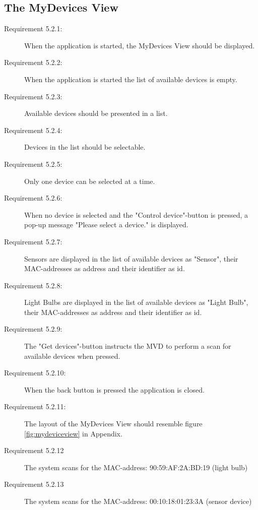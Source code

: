\documentclass[a4paper]{article}
\begin{document}
\subsection{The MyDevices View}
\begin{description}
\item[Requirement 5.2.1:] When the application is started, the MyDevices View should be displayed.

\item[Requirement 5.2.2:] When the application is started the list of available devices is empty.

\item[Requirement 5.2.3:] Available devices should be presented in a list.

\item[Requirement 5.2.4:] Devices in the list should be selectable.

\item[Requirement 5.2.5:] Only one device can be selected at a time.

\item[Requirement 5.2.6:] When no device is selected and the "Control device"-button is pressed, a pop-up message "Please select a device." is displayed.

\item[Requirement 5.2.7:] Sensors are displayed in the list of available devices as "Sensor", their MAC-addresses as address and their identifier as id.

\item[Requirement 5.2.8:] Light Bulbs are displayed in the list of available devices as "Light Bulb", their MAC-addresses as address and their identifier as id.

\item[Requirement 5.2.9:] The "Get devices"-button instructs the MVD to perform a scan for available devices when pressed.

\item[Requirement 5.2.10:] When the back button is pressed the application is closed.

\item[Requirement 5.2.11:] The layout of the MyDevices View should resemble figure \ref{fig:mydeviceview} in Appendix.

\item[Requirement 5.2.12] The system scans for the MAC-address: 90:59:AF:2A:BD:19 (light bulb)

\item[Requirement 5.2.13] The system scans for the MAC-address: 00:10:18:01:23:3A (sensor device)


\end{description}
\end{document}
